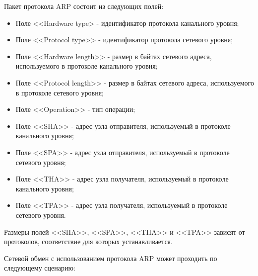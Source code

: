 	Пакет протокола ARP состоит из следующих полей:

	\begin{itemize}
			
		\item Поле <<Hardware type> - идентификатор протокола канального уровня;
		\item Поле <<Protocol type>> - идентификатор протокола сетевого уровня;
		\item Поле <<Hardware length>> - размер в байтах сетевого адреса, используемого в протоколе канального уровня;
		\item Поле <<Protocol length>> - размер в байтах сетевого адреса, используемого в протоколе сетевого уровня;
		\item Поле <<Operation>> - тип операции;
		\item Поле <<SHA>> - адрес узла отправителя, используемый в протоколе канального уровня;
		\item Поле <<SPA>> - адрес узла отправителя, используемый в протоколе сетевого уровня;
		\item Поле <<THA>> - адрес узла получателя, используемый в протоколе канального уровня;
		\item Поле <<TPA>> - адрес узла получателя, используемый в протоколе сетевого уровня.

	\end{itemize}

	Размеры полей <<SHA>>, <<SPA>>, <<THA>> и <<TPA>> зависят от протоколов, соответствие для которых устанавливается. 

	Сетевой обмен с использованием протокола ARP может проходить по следующему сценарию:

